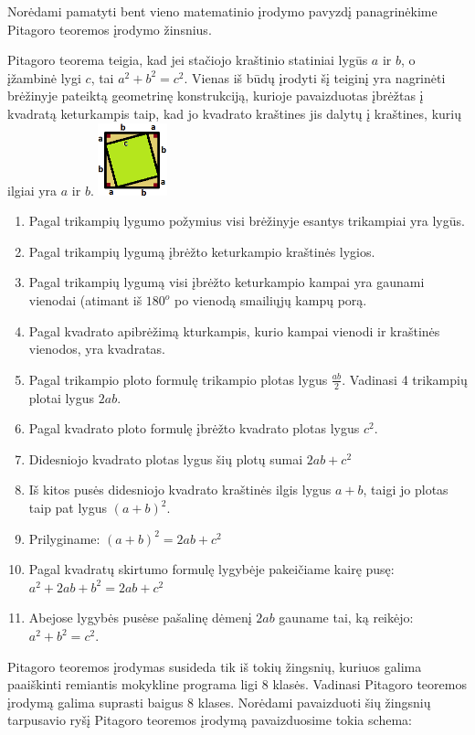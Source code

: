 \documentclass{article}
\begin{document}
Norėdami pamatyti bent vieno matematinio įrodymo pavyzdį panagrinėkime Pitagoro teoremos įrodymo žinsnius. 

Pitagoro teorema teigia, kad jei stačiojo kraštinio statiniai lygūs $a$ ir $b$, o įžambinė lygi $c$, tai $a^2+b^2=c^2$. Vienas iš būdų įrodyti šį teiginį yra nagrinėti brėžinyje pateiktą geometrinę konstrukciją, kurioje pavaizduotas įbrėžtas į kvadratą keturkampis taip, kad jo kvadrato kraštines jis dalytų į kraštines, kurių ilgiai yra $a$ ir $b$.
\newpage
\includegraphics[width=0.15\textwidth]{pyth.png}
\begin{enumerate}
\item Pagal trikampių lygumo požymius visi brėžinyje esantys trikampiai yra lygūs.
\item Pagal trikampių lygumą įbrėžto keturkampio kraštinės lygios.
\item Pagal trikampių lygumą visi įbrėžto keturkampio kampai yra gaunami vienodai (atimant iš $180^o$ po vienodą smailiųjų kampų porą.
\item Pagal kvadrato apibrėžimą kturkampis, kurio kampai vienodi ir kraštinės vienodos, yra kvadratas.
\item Pagal trikampio ploto formulę trikampio plotas lygus $\frac{ab}{2}$. Vadinasi 4 trikampių plotai lygus $2ab$. 
\item Pagal kvadrato ploto formulę įbrėžto kvadrato plotas lygus $c^2$.
\item Didesniojo kvadrato plotas lygus šių plotų sumai $2ab+c^2$
\item Iš kitos pusės didesniojo kvadrato kraštinės ilgis lygus $a+b$, taigi jo plotas taip pat lygus $(a+b)^2$.
\item Prilyginame: $(a+b)^2=2ab+c^2$
\item Pagal kvadratų skirtumo formulę lygybėje pakeičiame kairę pusę: $a^2+2ab+b^2=2ab+c^2$
\item Abejose lygybės pusėse pašalinę dėmenį $2ab$ gauname tai, ką reikėjo: $a^2+b^2=c^2$.
\end{enumerate}

Pitagoro teoremos įrodymas susideda tik iš tokių žingsnių, kuriuos galima paaiškinti remiantis mokykline programa ligi 8 klasės. Vadinasi Pitagoro teoremos įrodymą galima suprasti baigus 8 klases. Norėdami pavaizduoti šių žingsnių tarpusavio ryšį Pitagoro teoremos įrodymą pavaizduosime tokia schema:
\end{document}
